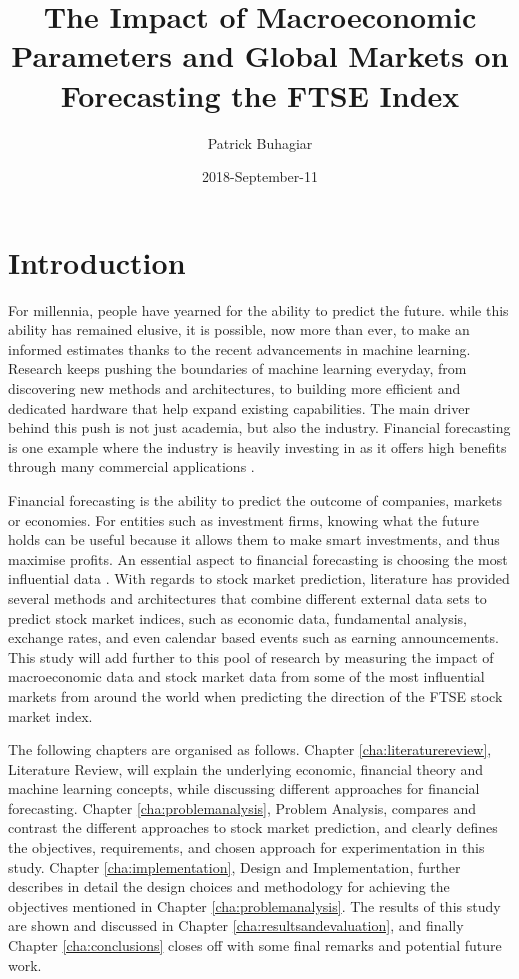 \documentclass{UoYCSproject}
\author{Patrick Buhagiar}
\title{The Impact of Macroeconomic Parameters and Global Markets on Forecasting the FTSE Index}
\date{2018-September-11}
\begin{document}
\maketitle

\listoffigures
\listoftables

\label{sec:start}
\thispagestyle{empty}\cleardoublepage

\chapter{Introduction}
\label{cha:Introduction}
For millennia, people have yearned for the ability to predict the future. while this ability has remained elusive, it is possible, now more than ever, to make an informed estimates thanks to the recent advancements in machine learning. Research keeps pushing the boundaries of machine learning everyday, from discovering new methods and architectures, to building more efficient and dedicated hardware that help expand existing capabilities. The main driver behind this push is not just academia, but also the industry.  Financial forecasting is one example where the industry is heavily investing in as it offers high benefits through many commercial applications \cite{majhi2007stock}.

Financial forecasting is the ability to predict the outcome of companies, markets or economies. For entities such as investment firms, knowing what the future holds can be useful because it allows them to make smart investments, and thus maximise profits. An essential aspect to financial forecasting is choosing the most influential data \cite{zhong2017forecasting}. With regards to stock market prediction, literature has provided several methods and architectures that combine different external data sets to predict stock market indices, such as economic data, fundamental analysis, exchange rates, and even calendar based events such as earning announcements. This study will add further to this pool of research by measuring the impact of macroeconomic data and stock market data from some of the most influential markets from around the world when predicting the direction of the FTSE stock market index.   

The following chapters are organised as follows. Chapter \ref{cha:literaturereview}, Literature Review, will explain the underlying economic, financial theory and machine learning concepts, while discussing different approaches for financial forecasting. Chapter \ref{cha:problemanalysis}, Problem Analysis, compares and contrast the different approaches to stock market prediction, and clearly defines the objectives, requirements, and chosen approach for experimentation in this study. Chapter \ref{cha:implementation}, Design and Implementation, further describes in detail the design choices and methodology for achieving the objectives mentioned in Chapter \ref{cha:problemanalysis}. The results of this study are shown and discussed in Chapter \ref{cha:resultsandevaluation}, and finally Chapter \ref{cha:conclusions} closes off with some final remarks and potential future work. 
\end{document}
